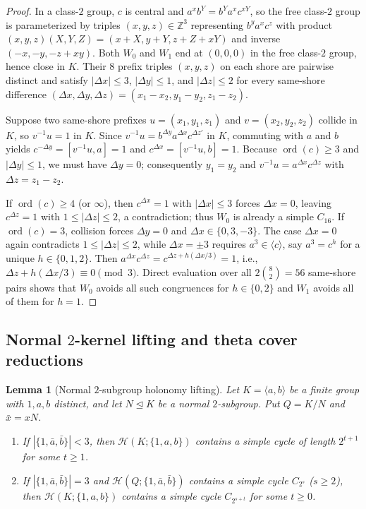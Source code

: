 \documentclass[11pt]{amsart}
\newtheorem{lemma}[theorem]{Lemma}
\theoremstyle{definition}
\theoremstyle{remark}
\newcommand{\Z}{\mathbb{Z}}
\newcommand{\Haar}{\mathcal{H}}
\newcommand{\ord}{\operatorname{ord}}
\begin{document}
\begin{proof}
In a class-$2$ group, $c$ is central and $a^x b^Y = b^Y a^x c^{xY}$, so the free class-$2$ group is parameterized by triples $(x,y,z) \in \Z^3$ representing $b^y a^x c^z$ with product $(x,y,z)(X,Y,Z) = (x+X, y+Y, z+Z+xY)$ and inverse $(-x,-y,-z+xy)$. Both $W_0$ and $W_1$ end at $(0,0,0)$ in the free class-$2$ group, hence close in $K$. Their $8$ prefix triples $(x,y,z)$ on each shore are pairwise distinct and satisfy $|\Delta x| \le 3$, $|\Delta y| \le 1$, and $|\Delta z| \le 2$ for every same-shore difference $(\Delta x, \Delta y, \Delta z) = (x_1 - x_2, y_1 - y_2, z_1 - z_2)$.

Suppose two same-shore prefixes $u=(x_1,y_1,z_1)$ and $v=(x_2,y_2,z_2)$ collide in $K$, so $v^{-1}u = 1$ in $K$. Since $v^{-1}u = b^{\Delta y} a^{\Delta x} c^{\Delta z'}$ in $K$, commuting with $a$ and $b$ yields $c^{-\Delta y} = [v^{-1}u, a] = 1$ and $c^{\Delta x} = [v^{-1}u, b] = 1$. Because $\ord(c) \ge 3$ and $|\Delta y| \le 1$, we must have $\Delta y = 0$; consequently $y_1 = y_2$ and $v^{-1} u = a^{\Delta x} c^{\Delta z}$ with $\Delta z = z_1 - z_2$.

If $\ord(c) \ge 4$ (or $\infty$), then $c^{\Delta x} = 1$ with $|\Delta x| \le 3$ forces $\Delta x = 0$, leaving $c^{\Delta z} = 1$ with $1 \le |\Delta z| \le 2$, a contradiction; thus $W_0$ is already a simple $C_{16}$. If $\ord(c) = 3$, collision forces $\Delta y = 0$ and $\Delta x \in \{0, 3, -3\}$. The case $\Delta x = 0$ again contradicts $1 \le |\Delta z| \le 2$, while $\Delta x = \pm 3$ requires $a^3 \in \langle c \rangle$, say $a^3 = c^h$ for a unique $h \in \{0,1,2\}$. Then $a^{\Delta x} c^{\Delta z} = c^{\Delta z + h(\Delta x/3)} = 1$, i.e., $\Delta z + h(\Delta x/3) \equiv 0 \pmod 3$. Direct evaluation over all $2 \binom{8}{2} = 56$ same-shore pairs shows that $W_0$ avoids all such congruences for $h \in \{0, 2\}$ and $W_1$ avoids all of them for $h = 1$.
\end{proof}

\subsection{Normal $2$-kernel lifting and theta cover reductions}

\begin{lemma}[Normal $2$-subgroup holonomy lifting]\label{lem:2kernel}
Let $K = \langle a, b \rangle$ be a finite group with $1, a, b$ distinct, and let $N \trianglelefteq K$ be a normal $2$-subgroup. Put $Q = K/N$ and $\bar{x} = xN$.
\begin{enumerate}[label=(\alph*)]
\item If $|\{1, \bar{a}, \bar{b}\}| < 3$, then $\Haar(K; \{1, a, b\})$ contains a simple cycle of length $2^{t+1}$ for some $t \ge 1$.
\item If $|\{1, \bar{a}, \bar{b}\}| = 3$ and $\Haar(Q; \{1, \bar{a}, \bar{b}\})$ contains a simple cycle $C_{2^s}$ ($s \ge 2$), then $\Haar(K; \{1, a, b\})$ contains a simple cycle $C_{2^{s+t}}$ for some $t \ge 0$.
\end{enumerate}
\end{lemma}
\end{document}
